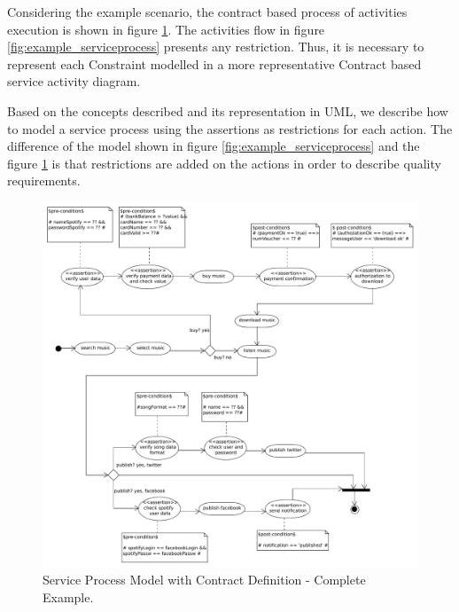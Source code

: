 Considering the example scenario, the contract based process of activities
execution is shown in figure \ref{fig:serviceprocessContract}.
The activities flow in figure \ref{fig:example_serviceprocess} presents any restriction. Thus, it is necessary
to represent each {\sc Constraint} modelled in a more representative {\sc
Contract} based service activity diagram.

Based on the concepts described and its representation in UML, we describe how
to model a service process using the assertions as restrictions for each action.
The difference of the model shown in figure \ref{fig:example_serviceprocess}
and the figure \ref{fig:serviceprocessContract} is that restrictions are added
on the actions in order to describe quality requirements.


\begin{figure}[ht!]
\centering
\includegraphics[width=.99\textwidth]{chapters/methodology/figs/piserviceprocess/runningExampleSP_final.pdf}
\caption{Service Process Model with Contract Definition - Complete Example.}
\label{fig:serviceprocessContract}
\end{figure}




